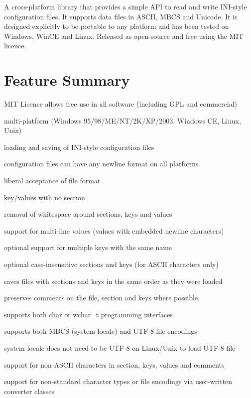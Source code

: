 A cross-\/platform library that provides a simple A\+PI to read and write I\+N\+I-\/style configuration files. It supports data files in A\+S\+C\+II, M\+B\+CS and Unicode. It is designed explicitly to be portable to any platform and has been tested on Windows, Win\+CE and Linux. Released as open-\/source and free using the M\+IT licence.

\section*{Feature Summary}


\begin{DoxyItemize}
\item M\+IT Licence allows free use in all software (including G\+PL and commercial)
\item multi-\/platform (Windows 95/98/\+M\+E/\+N\+T/2\+K/\+X\+P/2003, Windows CE, Linux, Unix)
\item loading and saving of I\+N\+I-\/style configuration files
\item configuration files can have any newline format on all platforms
\item liberal acceptance of file format
\begin{DoxyItemize}
\item key/values with no section
\item removal of whitespace around sections, keys and values
\end{DoxyItemize}
\item support for multi-\/line values (values with embedded newline characters)
\item optional support for multiple keys with the same name
\item optional case-\/insensitive sections and keys (for A\+S\+C\+II characters only)
\item saves files with sections and keys in the same order as they were loaded
\item preserves comments on the file, section and keys where possible.
\item supports both char or wchar\+\_\+t programming interfaces
\item supports both M\+B\+CS (system locale) and U\+T\+F-\/8 file encodings
\item system locale does not need to be U\+T\+F-\/8 on Linux/\+Unix to load U\+T\+F-\/8 file
\item support for non-\/\+A\+S\+C\+II characters in section, keys, values and comments
\item support for non-\/standard character types or file encodings via user-\/written converter classes

\end{DoxyItemize}
